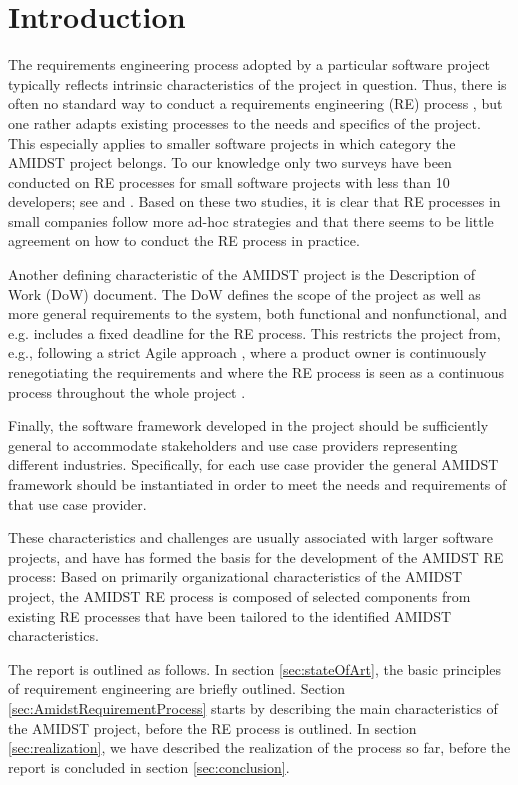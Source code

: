 \section{Introduction}

The requirements engineering process adopted by a particular software project typically reflects intrinsic
characteristics of the project in question. Thus, there is often no standard way to conduct a requirements engineering
(RE) process \cite{Poh10}, but one rather adapts existing processes to the needs and specifics of the project. This
especially applies to smaller software projects in which category the AMIDST project belongs. To our
knowledge only two surveys have been conducted on RE processes for small software projects with less than 10 developers;
see \cite{Qui10} and \cite{Ara07}.  Based on these two studies, it is clear that RE processes in small companies follow
more ad-hoc strategies and that there seems to be little agreement on how to conduct the RE process in practice. 
 
Another defining characteristic of the AMIDST project is the Description of Work (DoW) document. The DoW defines the scope of the
project as well as more general requirements to the system, both functional and nonfunctional, and e.g. includes a fixed deadline
for the RE process. This restricts the project from, e.g., following a strict Agile approach
\cite{Din10}, where a product owner is continuously renegotiating the requirements and where the RE process is seen as a
continuous process throughout the whole project \cite{Kav11}.

Finally, the software framework developed in the project should be sufficiently general to accommodate stakeholders and
use case providers representing different industries. Specifically, for each use case provider the general AMIDST
framework should be instantiated in order to meet the needs and requirements of that use case provider.   

These characteristics and challenges are usually associated with larger software projects, and have has formed
the basis for the development of the AMIDST RE process: Based on primarily organizational characteristics of the AMIDST
project, the AMIDST RE process is composed of selected components from existing RE processes that have been tailored to
the identified AMIDST characteristics.    

The report is outlined as follows.  In section \ref{sec:stateOfArt}, the basic principles of requirement engineering are
briefly outlined.  Section \ref{sec:AmidstRequirementProcess} starts by describing the main characteristics of the
AMIDST project, before the RE process is outlined.  In section \ref{sec:realization}, we have described the realization
of the process so far, before the report is concluded in section \ref{sec:conclusion}. 
